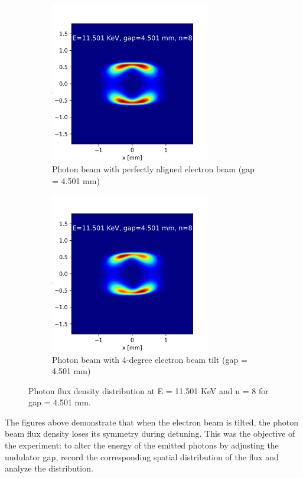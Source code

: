 \documentclass[a4paper,12pt]{article}
\begin{document}
\begin{figure}[H]
\centering
\begin{subfigure}{0.4\textwidth}
\includegraphics[width=1\linewidth, height=7cm]{photonbeam_right_E=11.501 KeV, gap=4.501 mm, n=8.png} 
\caption{Photon beam with perfectly aligned electron beam (gap = 4.501 mm)}
\end{subfigure}
\begin{subfigure}{0.4\textwidth}
\includegraphics[width=1\linewidth, height=7cm]{photonbeam_tilted_E=11.501 KeV, gap=4.501 mm, n=8.png}
\caption{Photon beam with 4-degree electron beam tilt (gap = 4.501 mm)}
\end{subfigure}
\caption{Photon flux density distribution at E = 11.501 KeV and n = 8 for gap = 4.501 mm.}
\label{fig:pt3}
\end{figure}

The figures above demonstrate
 that when the electron beam is tilted,
  the photon beam flux density loses its
   symmetry during detuning. This was the objective of the experiment:
    to alter the energy of the emitted photons by adjusting
     the undulator gap, record the corresponding spatial distribution of the flux and analyze the distribution.
\end{document}
